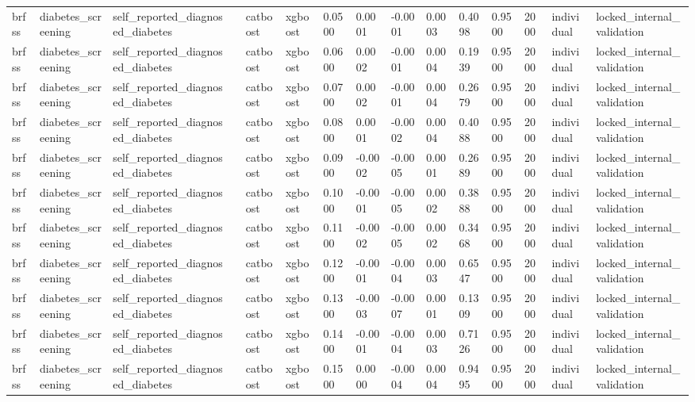 \begin{tabular}{lllllllllllllll}
brfss & diabetes\_screening & self\_reported\_diagnosed\_diabetes &  & catboost & xgboost & 0.0500 & 0.0001 & -0.0001 & 0.0003 & 0.4098 & 0.9500 & 2000 & individual & locked\_internal\_validation \\
brfss & diabetes\_screening & self\_reported\_diagnosed\_diabetes &  & catboost & xgboost & 0.0600 & 0.0002 & -0.0001 & 0.0004 & 0.1939 & 0.9500 & 2000 & individual & locked\_internal\_validation \\
brfss & diabetes\_screening & self\_reported\_diagnosed\_diabetes &  & catboost & xgboost & 0.0700 & 0.0002 & -0.0001 & 0.0004 & 0.2679 & 0.9500 & 2000 & individual & locked\_internal\_validation \\
brfss & diabetes\_screening & self\_reported\_diagnosed\_diabetes &  & catboost & xgboost & 0.0800 & 0.0001 & -0.0002 & 0.0004 & 0.4088 & 0.9500 & 2000 & individual & locked\_internal\_validation \\
brfss & diabetes\_screening & self\_reported\_diagnosed\_diabetes &  & catboost & xgboost & 0.0900 & -0.0002 & -0.0005 & 0.0001 & 0.2689 & 0.9500 & 2000 & individual & locked\_internal\_validation \\
brfss & diabetes\_screening & self\_reported\_diagnosed\_diabetes &  & catboost & xgboost & 0.1000 & -0.0001 & -0.0005 & 0.0002 & 0.3888 & 0.9500 & 2000 & individual & locked\_internal\_validation \\
brfss & diabetes\_screening & self\_reported\_diagnosed\_diabetes &  & catboost & xgboost & 0.1100 & -0.0002 & -0.0005 & 0.0002 & 0.3468 & 0.9500 & 2000 & individual & locked\_internal\_validation \\
brfss & diabetes\_screening & self\_reported\_diagnosed\_diabetes &  & catboost & xgboost & 0.1200 & -0.0001 & -0.0004 & 0.0003 & 0.6547 & 0.9500 & 2000 & individual & locked\_internal\_validation \\
brfss & diabetes\_screening & self\_reported\_diagnosed\_diabetes &  & catboost & xgboost & 0.1300 & -0.0003 & -0.0007 & 0.0001 & 0.1309 & 0.9500 & 2000 & individual & locked\_internal\_validation \\
brfss & diabetes\_screening & self\_reported\_diagnosed\_diabetes &  & catboost & xgboost & 0.1400 & -0.0001 & -0.0004 & 0.0003 & 0.7126 & 0.9500 & 2000 & individual & locked\_internal\_validation \\
brfss & diabetes\_screening & self\_reported\_diagnosed\_diabetes &  & catboost & xgboost & 0.1500 & 0.0000 & -0.0004 & 0.0004 & 0.9495 & 0.9500 & 2000 & individual & locked\_internal\_validation \\

\end{tabular}
